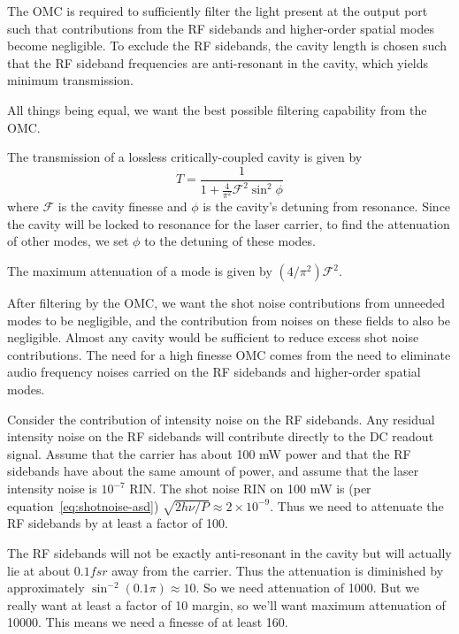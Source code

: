 
The OMC is required to sufficiently filter the light present at the
output port such that contributions from the RF sidebands and higher-order
spatial modes become negligible. To exclude the RF sidebands, the
cavity length is chosen such that the RF sideband frequencies are
anti-resonant in the cavity, which yields minimum transmission.


All things being equal, we want the best possible filtering capability
from the OMC.  

The transmission of a lossless critically-coupled cavity is given by
\begin{equation}
T = \frac{1}{1 + \frac{4}{\pi^2}\mathcal{F}^2\sin^2\phi}
\end{equation}
where $\mathcal{F}$ is the cavity finesse and $\phi$ is the cavity's
detuning from resonance.  Since the cavity will be locked to resonance
for the laser carrier, to find the attenuation of other modes, we set
$\phi$ to the detuning of these modes.

The maximum attenuation of a mode is given by $(4/\pi^2)\mathcal{F}^2$.

After filtering by the OMC, we want the shot noise contributions from
unneeded modes to be negligible, and the contribution from noises on
these fields to also be negligible.  Almost any cavity would be
sufficient to reduce excess shot noise contributions.  The need for a
high finesse OMC comes from the need to eliminate audio frequency
noises carried on the RF sidebands and higher-order spatial modes.

Consider the contribution of intensity noise on the RF sidebands.  Any
residual intensity noise on the RF sidebands will contribute directly
to the DC readout signal.  Assume that the carrier has about 100 mW
power and that the RF sidebands have about the same amount of power,
and assume that the laser intensity noise is $10^{-7}$ RIN.  The shot
noise RIN on 100 mW is (per equation~\ref{eq:shotnoise-asd})
$\sqrt{2h\nu/P} \approx 2\times10^{-9}$.  Thus we need to attenuate
the RF sidebands by at least a factor of 100.

The RF sidebands will not be exactly anti-resonant in the cavity but
will actually lie at about $0.1 fsr$ away from the carrier.  Thus the
attenuation is diminished by approximately $\sin^{-2} (0.1 \pi)
\approx 10$.  So we need attenuation of 1000.  But we really want at
least a factor of 10 margin, so we'll want maximum attenuation of
10000. This means we need a finesse of at least 160.



